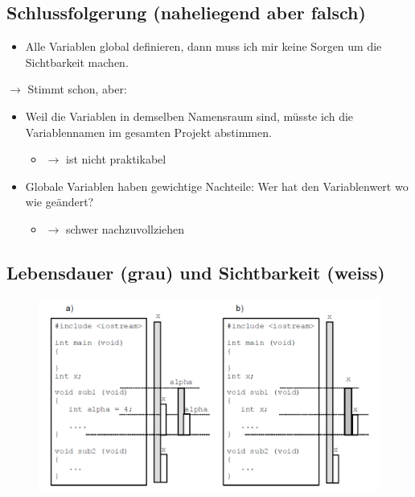 \subsection{Schlussfolgerung (naheliegend aber falsch)}
\begin{itemize}
	\item Alle Variablen global definieren, dann muss ich mir keine Sorgen um die Sichtbarkeit machen.
\end{itemize}
$\rightarrow$ Stimmt schon, aber:
\begin{itemize}
	\item Weil die Variablen in demselben Namensraum sind, müsste ich die Variablennamen im gesamten Projekt abstimmen.
	\begin{itemize}
		\item[\-] $\rightarrow$ ist nicht praktikabel
	\end{itemize}
	\item Globale Variablen haben gewichtige Nachteile: Wer hat den Variablenwert wo wie geändert?
	\begin{itemize}
		\item[\-] $\rightarrow$ schwer nachzuvollziehen
	\end{itemize}
\end{itemize}

\subsection{Lebensdauer (grau) und Sichtbarkeit (weiss)}
\noindent
\begin{figure}[hh]
	\centering
	\includegraphics[width=0.7\linewidth]{images/scope1.pdf}
\end{figure}

